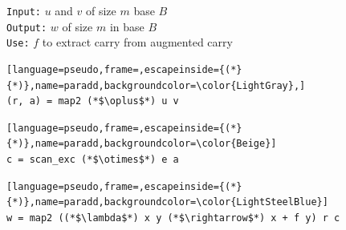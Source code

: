 \begin{figure}
  \centering
  \begin{minipage}{0.47\textwidth}
    \footnotesize
    \texttt{Input:} $u$ and $v$ of size $m$ base $B$\\
    \texttt{Output:} $w$ of size $m$ in base $B$\\
    \texttt{Use:} $f$ to extract carry from augmented carry
\begin{lstlisting}[language=pseudo,frame=,escapeinside={(*}{*)},name=paradd,backgroundcolor=\color{LightGray},]
(r, a) = map2 (*$\oplus$*) u v
\end{lstlisting}
\vspace{-\baselineskip}
\begin{lstlisting}[language=pseudo,frame=,escapeinside={(*}{*)},name=paradd,backgroundcolor=\color{Beige}]
c = scan_exc (*$\otimes$*) e a
\end{lstlisting}
\vspace{-\baselineskip}
\begin{lstlisting}[language=pseudo,frame=,escapeinside={(*}{*)},name=paradd,backgroundcolor=\color{LightSteelBlue}]
w = map2 ((*$\lambda$*) x y (*$\rightarrow$*) x + f y) r c
\end{lstlisting}
\end{minipage}
  \noindent{}
\end{figure}
